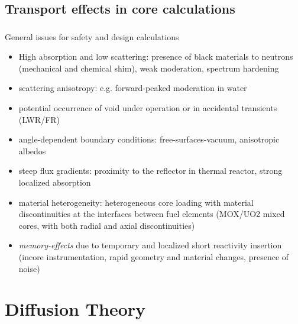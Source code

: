 \documentclass[black]{slideCEA}
\begin{document}
\subsection{Transport effects in core calculations}
\begin{frame}
  \frametitle{\insertsubsectionhead}
  \begin{block}{General issues for safety and design calculations}%
  { \vspace{3mm}
  \begin{itemize} \large
    \setlength{\itemsep}{3mm}
    \item \textcolor{ceablue1}{High absorption} and \textcolor{ceablue1}{low scattering}: presence of black materials to neutrons (mechanical and chemical shim), weak moderation, spectrum hardening
    \item \textcolor{ceablue1}{scattering anisotropy}: e.g. forward-peaked moderation in water
    \item potential \textcolor{ceablue1}{occurrence of void} under operation or in accidental transients (LWR/FR)
    \item angle-dependent boundary conditions: free-surfaces-vacuum, anisotropic albedos
    \item \textcolor{ceablue1}{steep flux gradients}: proximity to the reflector in thermal reactor, strong localized absorption
    \item \textcolor{ceablue1}{material heterogeneity}: heterogeneous core loading with material discontinuities at the interfaces between fuel elements (MOX/UO2 mixed cores, with both radial and axial discontinuities)
    \item \emph{memory-effects} due to temporary and localized short reactivity insertion (incore instrumentation, rapid geometry and material changes, presence of noise)
  \end{itemize}
  }
  \end{block}
\end{frame}

\section{Diffusion Theory}
\end{document}
